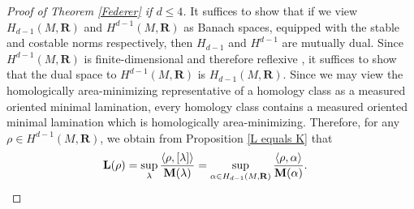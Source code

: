 \documentclass[reqno,11pt]{amsart}
\newcommand{\RR}{\mathbf{R}}
\newcommand{\Mass}{\mathbf M}
\newcommand{\Comass}{\mathbf L}
\newtheorem{corollary}[theorem]{Corollary}
\theoremstyle{definition}
\numberwithin{equation}{section}
\begin{document}
\begin{proof}[Proof of Theorem \ref{Federer} if $d \leq 4$]
It suffices to show that if we view $H_{d - 1}(M, \RR)$ and $H^{d - 1}(M, \RR)$ as Banach spaces, equipped with the stable and costable norms respectively, then $H_{d - 1}$ and $H^{d - 1}$ are mutually dual.
Since $H^{d - 1}(M, \RR)$ is finite-dimensional and therefore reflexive \cite[Theorem 1.13.5]{megginson1998introduction}, it suffices to show that the dual space to $H^{d - 1}(M, \RR)$ is $H_{d - 1}(M, \RR)$.
Since we may view the homologically area-minimizing representative of a homology class as a measured oriented minimal lamination, every homology class contains a measured oriented minimal lamination which is homologically area-minimizing.
Therefore, for any $\rho \in H^{d - 1}(M, \RR)$, we obtain from Proposition \ref{L equals K} that
\begin{align*}
\Comass(\rho) &= \sup_\lambda \frac{\langle \rho, [\lambda] \rangle}{\Mass(\lambda)} = \sup_{\alpha \in H_{d - 1}(M, \RR)} \frac{\langle \rho, \alpha\rangle}{\Mass(\alpha)}. \qedhere 
\end{align*}
\end{proof}



\end{document}
